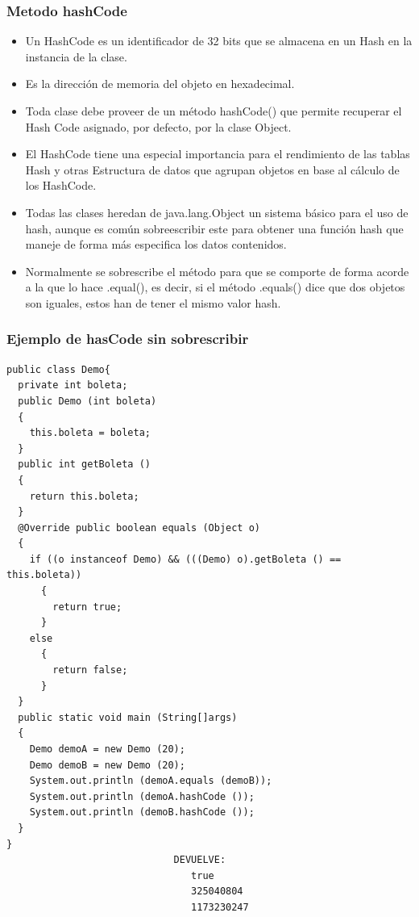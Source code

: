 \documentclass{beamer}
\begin{document}
\begin{frame}
\frametitle{Metodo hashCode}
\begin{itemize}[<+->]
\item Un HashCode es un identificador de 32 bits que se almacena en un Hash en la instancia de la clase.
\item Es la dirección de memoria del objeto en hexadecimal.
\item Toda clase debe proveer de un método hashCode() que permite recuperar el Hash Code asignado, por defecto, por la clase Object. 
\item  El HashCode tiene una especial importancia para el rendimiento de las tablas Hash y otras Estructura de datos que agrupan objetos en base al cálculo de los HashCode.
\item Todas las clases heredan de java.lang.Object un sistema básico para el uso de hash, aunque es común sobreescribir este para obtener una función hash que maneje de forma más especifica los datos contenidos.
\item Normalmente se sobrescribe el método para que se comporte de forma acorde a la que lo hace .equal(), es decir, si el método .equals() dice que dos objetos son iguales, estos han de tener el mismo valor hash.


\end{itemize}
\end{frame}

\begin{frame}[fragile]
\frametitle{Ejemplo de hasCode sin sobrescribir}
\begin{tiny}
\begin{verbatim}
public class Demo{
  private int boleta;
  public Demo (int boleta)
  {
    this.boleta = boleta;
  }
  public int getBoleta ()
  {
    return this.boleta;
  }
  @Override public boolean equals (Object o)
  {
    if ((o instanceof Demo) && (((Demo) o).getBoleta () == this.boleta))
      {
        return true;
      }
    else
      {
        return false;
      }
  }
  public static void main (String[]args)
  {
    Demo demoA = new Demo (20);
    Demo demoB = new Demo (20);
    System.out.println (demoA.equals (demoB));
    System.out.println (demoA.hashCode ());
    System.out.println (demoB.hashCode ());
  }
}
                             DEVUELVE:
                                true
                                325040804
                                1173230247
\end{verbatim}
\end{tiny}
\end{frame}
\end{document}
